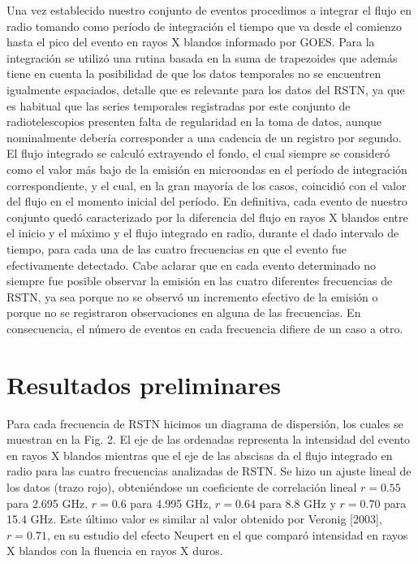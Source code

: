 \documentclass[baaa]{baaa}
\begin{document}
Una vez establecido nuestro conjunto de eventos procedimos a integrar el flujo 
en radio tomando como per\'iodo de integraci\'on el tiempo que va desde el comienzo hasta el pico del evento en 
rayos X blandos informado por GOES. Para la integraci\'on se utiliz\'o una rutina basada en la suma de trapezoides que adem\'as 
tiene en cuenta la posibilidad de que los datos temporales no se encuentren igualmente espaciados, detalle que es relevante 
para los datos del RSTN, ya que es habitual que las series temporales registradas por este conjunto de radiotelescopios presenten 
falta de regularidad en la toma de datos, aunque nominalmente deber\'ia corresponder a una cadencia de un registro por 
segundo. El flujo integrado se calcul\'o extrayendo el fondo, el cual siempre se consider\'o como el valor m\'as bajo 
de la emisi\'on en microondas en el per\'iodo de integraci\'on correspondiente, y el cual, en la gran mayor\'ia de los casos, 
coincidi\'o con el valor del flujo en el momento inicial del per\'iodo. En definitiva, cada evento de nuestro conjunto 
qued\'o caracterizado por la diferencia del flujo en rayos X blandos entre el inicio y el m\'aximo y el flujo integrado en radio, 
durante el dado intervalo de tiempo, para cada una de las cuatro frecuencias en que el evento fue efectivamente detectado. 
Cabe aclarar que en cada evento determinado no siempre fue posible observar la emisi\'on en las cuatro diferentes frecuencias 
de RSTN, ya sea porque no se observ\'o un incremento efectivo de la emisi\'on o porque no se registraron observaciones 
en alguna de las frecuencias. En consecuencia, el n\'umero de eventos en cada frecuencia difiere de un caso a otro.


\section{Resultados preliminares}

Para cada frecuencia de RSTN hicimos un diagrama de dispersi\'on, los cuales se muestran en la Fig. 2. 
El eje de las ordenadas representa la intensidad del evento en rayos X blandos mientras que el eje de las abscisas da 
el flujo integrado en radio para las cuatro frecuencias analizadas de RSTN. Se hizo 
un ajuste lineal de los datos (trazo rojo), obteni\'endose un coeficiente de correlaci\'on lineal   $r=0.55$ para 
2.695 GHz, $r=0.6$ para 4.995 GHz, $r=0.64$ para 8.8 GHz y $r=0.70$ para 15.4 GHz. Este \'ultimo valor es similar 
al valor obtenido por Veronig [2003], $r=0.71$, en su estudio del efecto Neupert en el que compar\'o intensidad en 
rayos X blandos con la fluencia en rayos X duros.
\end{document}
